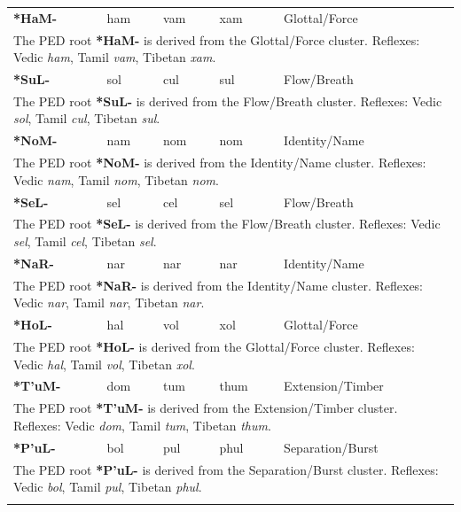 \begin{longtable}{p{} p{} p{} p{} p{}}
\textbf{*HaM-} & ham & vam & xam & Glottal/Force \\ 
\multicolumn{5}{p{\textwidth}}{\small The PED root \textbf{*HaM-} is derived from the Glottal/Force cluster. Reflexes: Vedic \textit{ham}, Tamil \textit{vam}, Tibetan \textit{xam}. } \\ \addlinespace 
\textbf{*SuL-} & sol & cul & sul & Flow/Breath \\ 
\multicolumn{5}{p{\textwidth}}{\small The PED root \textbf{*SuL-} is derived from the Flow/Breath cluster. Reflexes: Vedic \textit{sol}, Tamil \textit{cul}, Tibetan \textit{sul}. } \\ \addlinespace 
\textbf{*NoM-} & nam & nom & nom & Identity/Name \\ 
\multicolumn{5}{p{\textwidth}}{\small The PED root \textbf{*NoM-} is derived from the Identity/Name cluster. Reflexes: Vedic \textit{nam}, Tamil \textit{nom}, Tibetan \textit{nom}. } \\ \addlinespace 
\textbf{*SeL-} & sel & cel & sel & Flow/Breath \\ 
\multicolumn{5}{p{\textwidth}}{\small The PED root \textbf{*SeL-} is derived from the Flow/Breath cluster. Reflexes: Vedic \textit{sel}, Tamil \textit{cel}, Tibetan \textit{sel}. } \\ \addlinespace 
\textbf{*NaR-} & nar & nar & nar & Identity/Name \\ 
\multicolumn{5}{p{\textwidth}}{\small The PED root \textbf{*NaR-} is derived from the Identity/Name cluster. Reflexes: Vedic \textit{nar}, Tamil \textit{nar}, Tibetan \textit{nar}. } \\ \addlinespace 
\textbf{*HoL-} & hal & vol & xol & Glottal/Force \\ 
\multicolumn{5}{p{\textwidth}}{\small The PED root \textbf{*HoL-} is derived from the Glottal/Force cluster. Reflexes: Vedic \textit{hal}, Tamil \textit{vol}, Tibetan \textit{xol}. } \\ \addlinespace 
\textbf{*T'uM-} & dom & tum & thum & Extension/Timber \\ 
\multicolumn{5}{p{\textwidth}}{\small The PED root \textbf{*T'uM-} is derived from the Extension/Timber cluster. Reflexes: Vedic \textit{dom}, Tamil \textit{tum}, Tibetan \textit{thum}. } \\ \addlinespace 
\textbf{*P'uL-} & bol & pul & phul & Separation/Burst \\ 
\multicolumn{5}{p{\textwidth}}{\small The PED root \textbf{*P'uL-} is derived from the Separation/Burst cluster. Reflexes: Vedic \textit{bol}, Tamil \textit{pul}, Tibetan \textit{phul}. } \\ \addlinespace 

\end{longtable}
